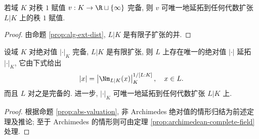 \begin{corollary}\label{prop:valuation-ext-complete-alg}
	若域 $K$ 对秩 $1$ 赋值 $v: K \to \R \sqcup \{\infty\}$ 完备, 则 $v$ 可唯一地延拓到任何代数扩张 $L|K$ 上的秩 $1$ 赋值.
\end{corollary}
\begin{proof}
	由命题 \ref{prop:alg-ext-dist}, $L|K$ 是有限子扩张的并.
\end{proof}

\begin{corollary}
	设域 $K$ 对绝对值 $|\cdot|_K$ 完备, $L|K$ 是有限扩张, 则 $L$ 上存在唯一的绝对值 $|\cdot|$ 延拓 $|\cdot|_K$, 它由下式给出
	\[ |x| = \left| \Nm_{L|K}(x) \right|_K^{1/[L:K]}, \quad x \in L. \]
	而且 $L$ 对之是完备的. 进一步, $|\cdot|_K$ 可唯一地延拓到任何代数扩张 $L|K$ 上.
\end{corollary}
\begin{proof}
	根据命题 \ref{prop:abs-valuation}, 非 Archimedes 绝对值的情形归结为前述定理及推论; 至于 Archimedes 的情形则可由定理 \ref{prop:archimedean-complete-field} 处理.
\end{proof}

